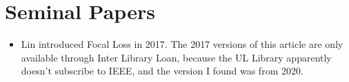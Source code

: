 \section{Seminal Papers}

\begin{itemize}
	\item Lin \cite{LIN_2020} introduced Focal Loss in 2017.  The 2017 versions of this article are only available through Inter Library Loan, because the UL Library apparently doesn't subscribe to IEEE, and the version I found was from 2020.  
 
\end{itemize}